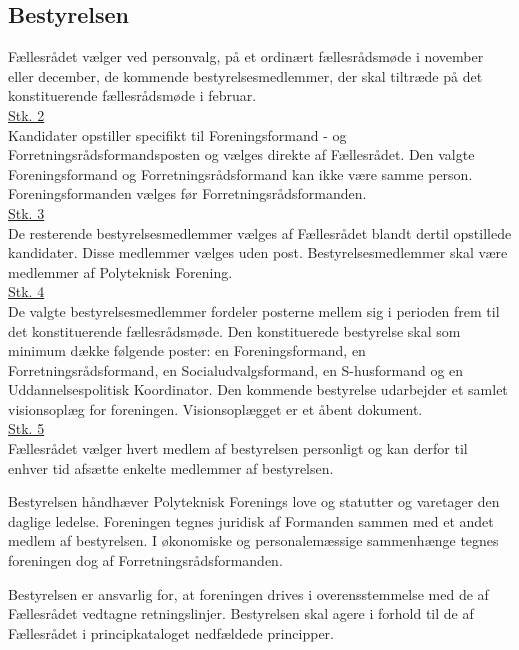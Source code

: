 \begin{list}
\subsection{Bestyrelsen}
\label{L:kap:bestyrelsen}
\item \label{L:best:valg} Fællesrådet vælger ved personvalg, på et ordinært fællesrådsmøde i november eller december, de kommende bestyrelsesmedlemmer, der skal tiltræde på det konstituerende fællesrådsmøde i februar.\\

\underline{Stk. 2}\\
Kandidater opstiller specifikt til Foreningsformand - og Forretningsrådsformandsposten og vælges direkte af Fællesrådet. Den valgte Foreningsformand og Forretningsrådsformand kan ikke være samme person. Foreningsformanden vælges før Forretningsrådsformanden.\\

\underline{Stk. 3}\\
De resterende bestyrelsesmedlemmer vælges af Fællesrådet blandt dertil opstillede kandidater. Disse medlemmer vælges uden post. Bestyrelsesmedlemmer skal være medlemmer af Polyteknisk Forening.\\

\underline{Stk. 4}\\
De valgte bestyrelsesmedlemmer fordeler posterne mellem sig i perioden frem til det konstituerende fællesrådsmøde. Den konstituerede bestyrelse skal som minimum dække følgende poster: en Foreningsformand, en Forretningsrådsformand, en Socialudvalgsformand, en S-husformand og en Uddannelsespolitisk Koordinator. Den kommende bestyrelse udarbejder et samlet visionsoplæg for foreningen. Visionsoplægget er et åbent dokument.\\

\underline{Stk. 5}\\ 
Fællesrådet vælger hvert medlem af bestyrelsen personligt og kan derfor til enhver tid afsætte enkelte medlemmer af bestyrelsen.\\

\item Bestyrelsen håndhæver Polyteknisk Forenings love og statutter og varetager den daglige ledelse. Foreningen tegnes juridisk af Formanden sammen med et andet medlem af bestyrelsen. I økonomiske og personalemæssige sammenhænge tegnes foreningen dog af Forretningsrådsformanden.\\

\item Bestyrelsen er ansvarlig for, at foreningen drives i overensstemmelse med de af Fællesrådet vedtagne retningslinjer. Bestyrelsen skal agere i forhold til de af Fællesrådet i principkataloget nedfældede principper.\\


\end{list}
